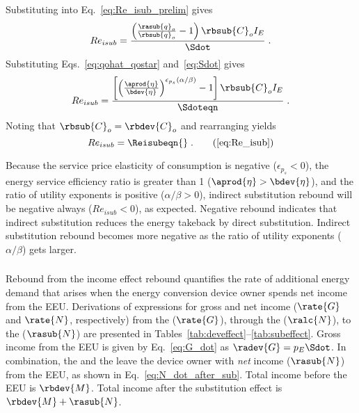 %
Substituting into Eq.~\ref{eq:Re_isub_prelim} gives
%
\begin{equation}
  Re_{isub} = \frac{\left( \frac{\rasub{q}_o}{\rbsub{q}_o} - 1  \right) \rbsub{C}_o I_E} {\Sdot} \; .
\end{equation}
Substituting Eqs.~\ref{eq:qohat_qostar} and~\ref{eq:Sdot} gives
%
\begin{equation}
  Re_{isub} = \frac{\left[ \left(\frac{\aprod{\eta}}{\bdev{\eta}} \right)
                  ^{\epsilon_{p_s} (\alpha / \beta )} - 1  \right] \rbsub{C}_o I_E}
                  {\Sdoteqn} \; .
\end{equation}
%
Noting that $\rbsub{C}_o = \rbdev{C}_o$ and rearranging yields
%
\begin{equation}
  Re_{isub} = \Reisubeqn{} \; . \tag{\ref{eq:Re_isub}}
\end{equation}

Because the service price elasticity of consumption is negative ($\epsilon_{p_s} < 0$),
the energy service efficiency ratio is greater than 1 ($\aprod{\eta} > \bdev{\eta}$),
and
the ratio of utility exponents is positive ($\alpha / \beta > 0$),
indirect substitution rebound will be negative always ($Re_{isub} < 0$),
as expected.
Negative rebound indicates that indirect substitution reduces the energy takeback by direct substitution.
Indirect substitution rebound becomes more negative
as the ratio of utility exponents ($\alpha / \beta$) gets larger.


\subsubsection{\Inceffect{}} 
\label{sec:Re_inc}

Rebound from the income effect rebound quantifies the rate of additional energy demand 
that arises when the energy conversion device owner spends net
income from the EEU.
Derivations of expressions for gross and net income ($\rate{G}$ and $\rate{N}$, respectively) from the 
\deveffect{} ($\rate{G}$), through the \lceffect{} ($\ralc{N}$), to the \subeffect{} ($\rasub{N}$)
are presented in Tables~\ref{tab:deveffect}--\ref{tab:subeffect}.
Gross income from the EEU is given by Eq.~\ref{eq:G_dot}
as $\radev{G} = p_E \Sdot$. 
In combination, the \lceffect{} and the \subeffect{} leave the device owner with
\emph{net} income ($\rasub{N}$) from the EEU,
as shown in Eq.~\ref{eq:N_dot_after_sub}.
Total income before the EEU is $\rbdev{M}$.
Total income after the substitution effect is $\rbdev{M} + \rasub{N}$.

